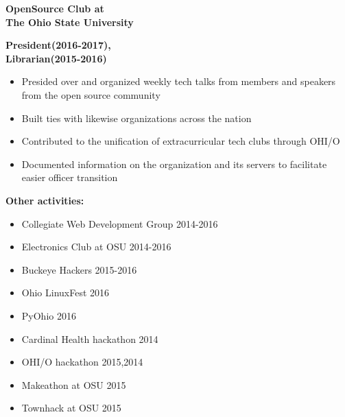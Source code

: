 \documentclass[letterpaper,10pt]{article}
\newcommand{\fullentry}[3] { \parbox[t]{.6\textwidth}{\large \bfseries #1} \hfill \parbox[t]{.4\textwidth}{\bfseries \raggedleft #2 \\ #3} \vspace{.5mm} \newline}
\begin{document}
		\fullentry{OpenSource Club at\\ The Ohio State University}{President(2016-2017),}{Librarian(2015-2016)}
		\vspace{-7mm}
		\begin{itemize}
			\item Presided over and organized weekly tech talks from members and speakers from the open source community
			\item Built ties with likewise organizations across the nation
			\item Contributed to the unification of extracurricular tech clubs through OHI/O
			\item Documented information on the organization and its servers to facilitate easier officer transition
		\end{itemize}

		{\bf Other activities:}

		\begin{multicols}{3} \raggedright
			\begin{itemize}
				\item Collegiate Web Development Group 2014-2016
				\item Electronics Club at OSU 2014-2016
				\item Buckeye Hackers 2015-2016
				\item Ohio LinuxFest 2016
				\item PyOhio 2016
				\item Cardinal Health hackathon 2014
				\item OHI/O hackathon 2015,2014
				\item Makeathon at OSU 2015
				\item Townhack at OSU 2015
			\end{itemize}
		\end{multicols}
		
\end{document}
